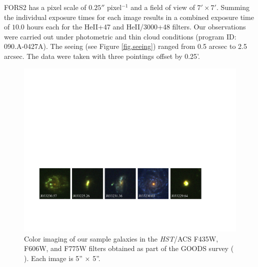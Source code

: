 \documentclass[twocolumn]{aastex61}
\begin{document}
FORS2 has a pixel scale of $0.25''$ pixel$^{-1}$ and a field of view of $7'\times7'$. Summing the individual exposure times for each image results in a combined exposure time of $10.0$ hours each for the HeII+47 and HeII/3000+48 filters. Our observations were carried out under photometric and thin cloud conditions (program ID: 090.A-0427A). The seeing (see Figure \ref{fig.seeing}) ranged from 0.5 arcsec to 2.5 arcsec. The data were taken with three pointings offset by 0.25'.

\begin{figure}[!ht]
\centering
\includegraphics[scale=.73]{../Figures/fors2_color_imstamps.pdf}
\caption{Color imaging of our sample galaxies in the \emph{HST}/ACS F435W, F606W, and F775W filters obtained as part of the GOODS survey (\citeauthor{Giavalisco2004} \citeyear{Giavalisco2004}). Each image is 5'' $\times$ 5''.\label{fig:hstims}}
\end{figure}
\end{document}
